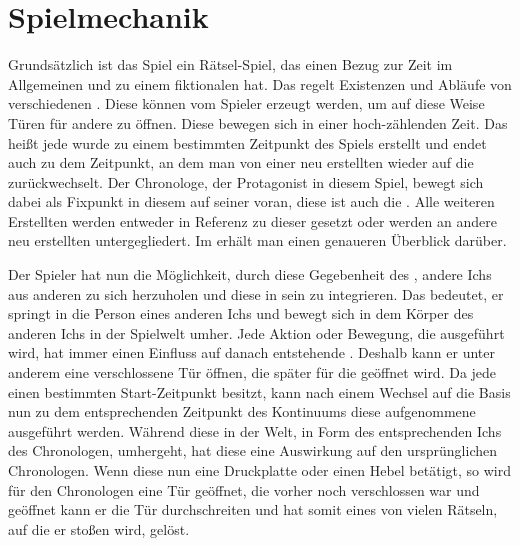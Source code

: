 \section{Spielmechanik}
Grundsätzlich ist das Spiel ein Rätsel-Spiel, das einen Bezug zur Zeit im Allgemeinen und zu einem fiktionalen  hat. Das  regelt Existenzen und Abläufe von verschiedenen . Diese  können vom Spieler erzeugt werden, um auf diese Weise Türen für andere  zu öffnen. Diese  bewegen sich in einer hoch-zählenden Zeit. Das heißt jede  wurde zu einem bestimmten Zeitpunkt des Spiels erstellt und endet auch zu dem Zeitpunkt, an dem man von einer neu erstellten  wieder auf die  zurückwechselt. Der Chronologe, der Protagonist in diesem Spiel, bewegt sich dabei als Fixpunkt in diesem  auf seiner  voran, diese ist auch die . Alle weiteren Erstellten  werden entweder in Referenz zu dieser  gesetzt oder werden an andere neu erstellten  untergegliedert. Im  erhält man einen genaueren Überblick darüber. 

Der Spieler hat nun die Möglichkeit, durch diese Gegebenheit des , andere Ichs aus anderen  zu sich herzuholen und diese in sein  zu integrieren. Das bedeutet, er springt in die Person eines anderen Ichs und bewegt sich in dem Körper des anderen Ichs in der Spielwelt umher. Jede Aktion oder Bewegung, die  ausgeführt wird, hat immer einen Einfluss auf danach entstehende . Deshalb kann er unter anderem eine verschlossene Tür öffnen, die später für die  geöffnet wird. Da jede  einen bestimmten Start-Zeitpunkt besitzt, kann nach einem Wechsel auf die Basis  nun zu dem entsprechenden Zeitpunkt des Kontinuums diese aufgenommene  ausgeführt werden. Während diese  in der Welt, in Form des entsprechenden Ichs des Chronologen, umhergeht, hat diese  eine Auswirkung auf den ursprünglichen Chronologen. Wenn diese  nun eine Druckplatte oder einen Hebel betätigt, so wird für den Chronologen eine Tür  geöffnet, die vorher noch verschlossen war und geöffnet kann er die Tür durchschreiten und hat somit eines von vielen Rätseln, auf die er stoßen wird, gelöst.

